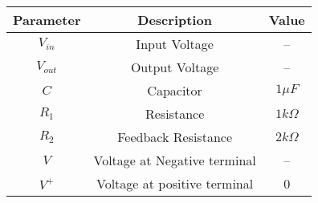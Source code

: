\begin{tabular}{|c|c|c|}
      \hline
      Parameter & Description & Value\\\hline
      $V_{in}$ & Input Voltage & --\\\hline
      $V_{out}$ & Output Voltage & --\\\hline
      $C$ & Capacitor & $1\mu F$\\\hline
      $R_1$ & Resistance & $1k\Omega$\\\hline
      $R_2$ & Feedback Resistance & $2k\Omega$\\\hline
      $V$ & Voltage at Negative terminal & --\\\hline
      $V^+$ & Voltage at positive terminal & 0\\\hline
\end{tabular}
